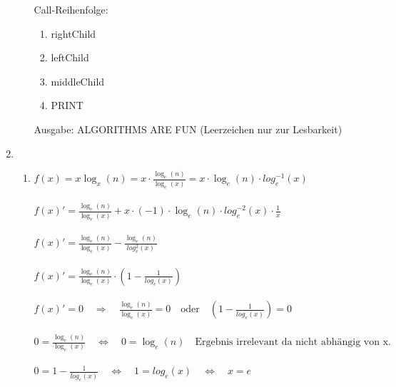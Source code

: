 \documentclass{article}
\begin{document}
\begin{enumerate}[\bfseries1.]
\begin{enumerate}
                Call-Reihenfolge:
                \begin{enumerate}[1.]
                    \item rightChild
                    \item leftChild
                    \item middleChild
                    \item PRINT
                \end{enumerate}
                    
                Ausgabe: ALGORITHMS ARE FUN (Leerzeichen nur zur Lesbarkeit)
        \end{enumerate}

    \item
        \begin{enumerate}
            \item
                $f(x) = x\log_x(n) = x \cdot \frac{\log_e(n)}{\log_e(x)} 
                        = x \cdot \log_e(n) \cdot log_e^{-1}(x) $
                \\
                \\
                $f(x)' = \frac{\log_e(n)} {\log_e(x)} 
                    + x \cdot (-1) \cdot \log_e(n) \cdot log_e^{-2}(x) \cdot
                    \frac{1}{x}$
                \\
                \\
                $f(x)' = \frac{\log_e(n)} {\log_e(x)} 
                    - \frac{\log_e(n)}{log_e^{2}(x)} $
                \\
                \\
                $f(x)' = \frac{\log_e(n)} {\log_e(x)} \cdot (1 -
                \frac{1}{log_e(x)}) $
                \\
                \\
                $f(x)' = 0 \quad \Rightarrow \quad 
                        \frac{\log_e(n)} {\log_e(x)}= 0 \quad \text{oder} 
                        \quad (1 - \frac{1}{log_e(x)}) = 0$
                \\
                \\
                $0 = \frac{\log_e(n)}{\log_e(x)} 
                \quad \Leftrightarrow \quad
                0 = \log_e(n) \quad
                \text{Ergebnis irrelevant da nicht abhängig von x.}$
                \\
                \\
                $0 = 1 - \frac{1}{log_e(x)}
                \quad \Leftrightarrow \quad
                1 = log_e(x) 
                \quad \Leftrightarrow \quad
                x = e
                $
                            

\end{enumerate}
\end{enumerate}
\end{document}
